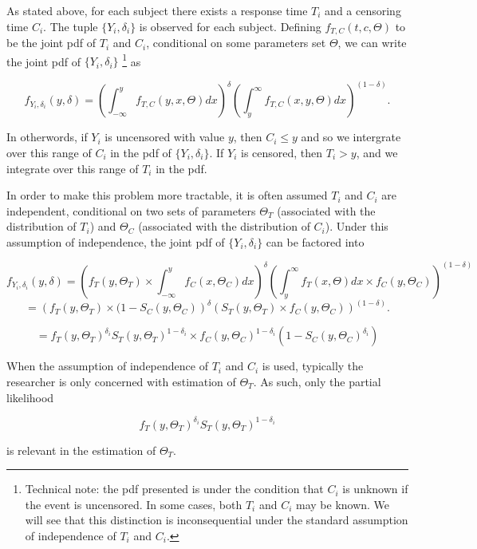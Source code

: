\documentclass[a4paper]{article}
\begin{document}
  As stated above, for each subject there exists a response time $T_i$ and a censoring time $C_i$. The tuple $\{Y_i, \delta_i\}$ is observed for each subject. Defining $f_{T, C}(t, c, \Theta)$ to be the joint pdf of $T_i$ and $C_i$, conditional on some parameters set $\Theta$, we can write the joint pdf of $\{Y_i, \delta_i\}$ 
  \footnote{Technical note: the pdf presented is under the condition that $C_i$ is unknown if the event is uncensored. In some cases, both $T_i$ and $C_i$ may be known. We will see that this distinction is inconsequential under the standard assumption of independence of $T_i$ and $C_i$.} as

  
  \[
  f_{Y_i, \delta_i}(y, \delta) = \left( \int_{-\infty}^{y} f_{T, C} (y, x, \Theta) dx \right) ^ {\delta}
  \left( \int_{y}^{\infty} f_{T, C} (x, y, \Theta) dx \right) ^{(1-\delta)}.
  \]

  In otherwords, if $Y_i$ is uncensored with value $y$, then $C_i \leq y$ and so we intergrate over this range of $C_i$ in the pdf of $\{Y_i, \delta_i\}$. If $Y_i$ is censored, then $T_i > y$, and we integrate over this range of $T_i$ in the pdf. 
  
  In order to make this problem more tractable, it is often assumed $T_i$ and $C_i$ are independent, conditional on two sets of parameters $\Theta_T$ (associated with the distribution of $T_i$) and $\Theta_C$ (associated with the distribution of $C_i$). Under this assumption of independence, the joint pdf of $\{Y_i, \delta_i\}$ can be factored into 
  
  \[
  f_{Y_i, \delta_i}(y, \delta) = 
  \left( f_{T} (y, \Theta_T) \times \int_{-\infty}^{y} f_{C}(x, \Theta_C) dx\right) ^ {\delta}
  \left( \int_{y}^{\infty} f_{T} (x, \Theta) dx \times f_{C}(y, \Theta_C) \right) ^{(1-\delta)}
  \]
  \[
  = 
  \left( f_{T} (y, \Theta_T) \times (1 - S_C(y, \Theta_{C}) \right) ^ {\delta}
  \left( S_T(y, \Theta_{T}) \times f_{C}(y, \Theta_C) \right) ^{(1-\delta)}.
  \]
  
  \[
  =
  f_{T}(y, \Theta_T) ^{\delta_i} S_{T}(y, \Theta_T) ^{1 - \delta_i} 
  \times
  f_C(y, \Theta_C)^{1 - \delta_i} (1 - S_C(y, \Theta_C) ^{\delta_i} )
  \]

  
  When the assumption of independence of $T_i$ and $C_i$ is used, typically the researcher is only concerned with estimation of $\Theta_T$. As such, only the partial likelihood 
  
  \[
  f_T(y, \Theta_T)^{\delta_i} S_T(y, \Theta_T)^{1-\delta_i}
  \]

is relevant in the estimation of $\Theta_T$. 
\end{document}
